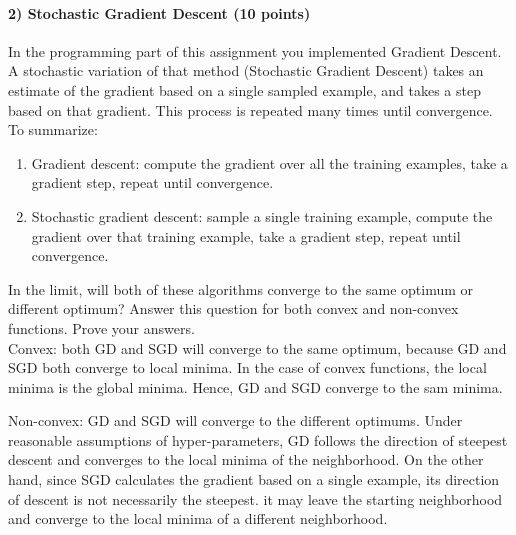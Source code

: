 \documentclass[11pt]{article}
\begin{document}
\paragraph{2) Stochastic Gradient Descent (10 points)}
In the programming part of this assignment you implemented Gradient Descent. A stochastic variation of that method (Stochastic Gradient Descent) takes an estimate of the gradient based on a single sampled example, and takes a step based on that gradient. This process is repeated many times until convergence. To summarize:
\begin{enumerate}
\item Gradient descent: compute the gradient over all the training examples, take a gradient step, repeat until convergence.\\
\item Stochastic gradient descent: sample a single training example, compute the gradient over that training example, take a gradient step, repeat until convergence.
\end{enumerate}

In the limit, will both of these algorithms converge to the same optimum or different optimum? Answer this question for both convex and non-convex functions. Prove your answers.\\

Convex: both GD and SGD will converge to the same optimum, because GD and SGD both converge to local minima. In the case of convex functions, the local minima is the global minima. Hence, GD and SGD converge to the sam minima.\newline

Non-convex: GD and SGD will converge to the different optimums. Under reasonable assumptions of hyper-parameters, GD follows the direction of steepest descent and converges to the local minima of the neighborhood. On the other hand, since SGD calculates the gradient based on a single example, its direction of descent is not necessarily the steepest. it may leave the starting neighborhood and converge to the local minima of a different neighborhood.
\end{document}
